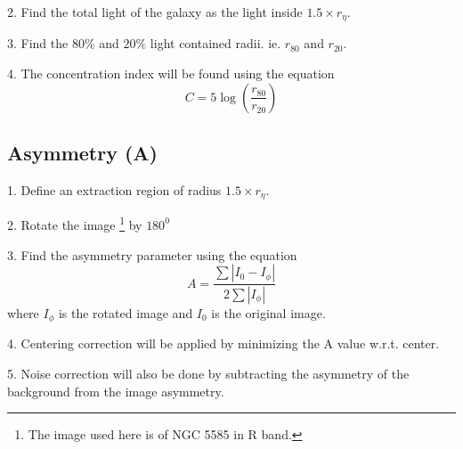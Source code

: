 \documentclass[a4paper,10pt]{article}
\begin{document}
2. Find the total light of the galaxy as the light inside $1.5 \times r_{\eta}$.

3. Find the $80\%$ and $20\%$ light contained radii. ie. $r_{80}$ and  $r_{20}$.

4. The concentration index will be found using the equation
\begin{equation}
C= 5 \log(\frac{r_{80}}{r_{20}})
\end{equation}

\subsection{Asymmetry (A)}

1. Define an extraction region of radius $1.5 \times r_{\eta}$.

2. Rotate the image \footnote{The image used here is of NGC 5585 in R band.} by $180^0$

3. Find the asymmetry parameter using the equation
\begin{equation}
A = \frac{\sum\left|I_0 - I_\phi\right|}{2\sum |I_\phi|}
\end{equation}
where $I_\phi$ is the rotated image and $I_0$ is the original image.

4. Centering correction will be applied by minimizing the A value w.r.t. center.

5. Noise correction will also be done by subtracting the asymmetry of the background from the image asymmetry.
\end{document}
